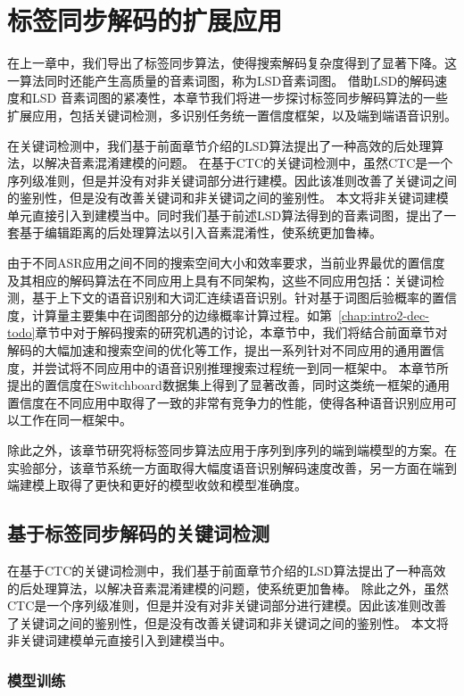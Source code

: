 
\chapter{标签同步解码的扩展应用}
\label{chap:lsd-apply}

在上一章中，我们导出了标签同步算法，使得搜索解码复杂度得到了显著下降。这一算法同时还能产生高质量的音素词图，称为LSD音素词图。
借助LSD的解码速度和LSD 音素词图的紧凑性，本章节我们将进一步探讨标签同步解码算法的一些扩展应用，包括关键词检测，多识别任务统一置信度框架，以及端到端语音识别。

在关键词检测中，我们基于前面章节介绍的LSD算法提出了一种高效的后处理算法，以解决音素混淆建模的问题。
在基于CTC的关键词检测中，虽然CTC是一个序列级准则，但是并没有对非关键词部分进行建模。因此该准则改善了关键词之间的鉴别性，但是没有改善关键词和非关键词之间的鉴别性。
本文将非关键词建模单元直接引入到建模当中。同时我们基于前述LSD算法得到的音素词图，提出了一套基于编辑距离的后处理算法以引入音素混淆性，使系统更加鲁棒。

由于不同ASR应用之间不同的搜索空间大小和效率要求，当前业界最优的置信度及其相应的解码算法在不同应用上具有不同架构，这些不同应用包括：关键词检测，基于上下文的语音识别和大词汇连续语音识别。针对基于词图后验概率的置信度，计算量主要集中在词图部分的边缘概率计算过程。如第~\ref{chap:intro2-dec-todo}章节中对于解码搜索的研究机遇的讨论，本章节中，我们将结合前面章节对解码的大幅加速和搜索空间的优化等工作，提出一系列针对不同应用的通用置信度，并尝试将不同应用中的语音识别推理搜索过程统一到同一框架中。
本章节所提出的置信度在Switchboard数据集上得到了显著改善，同时这类统一框架的通用置信度在不同应用中取得了一致的非常有竞争力的性能，使得各种语音识别应用可以工作在同一框架中。

除此之外，该章节研究将标签同步算法应用于序列到序列的端到端模型的方案。在实验部分，该章节系统一方面取得大幅度语音识别解码速度改善，另一方面在端到端建模上取得了更快和更好的模型收敛和模型准确度。


\section{基于标签同步解码的关键词检测}
\label{Sec:kws-ctc}


在基于CTC的关键词检测中，我们基于前面章节介绍的LSD算法提出了一种高效的后处理算法，以解决音素混淆建模的问题，使系统更加鲁棒。
除此之外，虽然CTC是一个序列级准则，但是并没有对非关键词部分进行建模。因此该准则改善了关键词之间的鉴别性，但是没有改善关键词和非关键词之间的鉴别性。
本文将非关键词建模单元直接引入到建模当中。

\subsection{模型训练}
\label{Sec:modeltrain}

